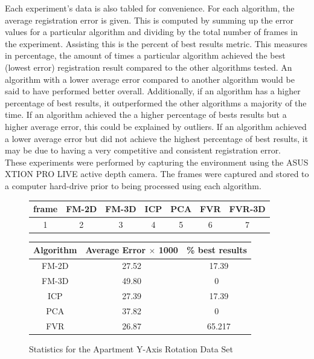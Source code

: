 Each experiment's data is also tabled for convenience. For each algorithm, the average registration error is given. This is computed by summing up the error values for a particular algorithm and dividing by the total number of frames in the experiment. Assisting this is the percent of best results metric. This measures in percentage, the amount of times a particular algorithm achieved the best (lowest error) registration result compared to the other algorithms tested. An algorithm with a lower average error compared to another algorithm would be said to have performed better overall. Additionally, if an algorithm has a higher percentage of best results, it outperformed the other algorithms a majority of the time. If an algorithm achieved the a higher percentage of bests results but a higher average error, this could be explained by outliers. If an algorithm achieved a lower average error but did not achieve the highest percentage of best results, it may be due to having a very competitive and consistent registration error. \\

These experiments were performed by capturing the environment using the ASUS XTION PRO LIVE active depth camera. The frames were captured and stored to a computer hard-drive prior to being processed using each algorithm. \\



\begin{figure}
\centering
\begin{tabular}{ccccccc}
\hline
\textbf{frame} & \textbf{FM-2D} & \textbf{FM-3D} & \textbf{ICP} & \textbf{PCA} & \textbf{FVR} & \textbf{FVR-3D}\\ \hline
1&2&3&4&5&6&7\\
\end{tabular}

\vspace{10mm}
\centering
\begin{tabular}{ccc}
\hline
\textbf{Algorithm} & \textbf{Average Error $\times$ 1000} & \textbf{\% best results}\\ \hline
FM-2D	& 27.52 & ~17.39\\
FM-3D	& 49.80 & 0\\
ICP		& 27.39 & ~17.39\\
PCA		& 37.82 & 0\\
FVR		& 26.87 & ~65.217\\
\end{tabular}

\caption{Statistics for the Apartment Y-Axis Rotation Data Set}
\label{tab:PET0ST}
\end{figure} 

